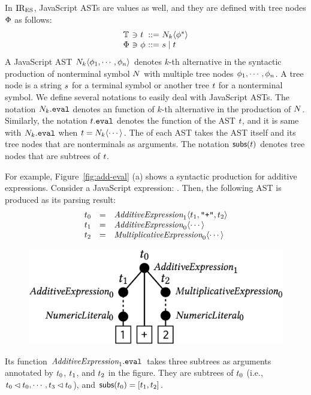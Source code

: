 In $\text{IR}_\text{ES}$, JavaScript ASTs are values as well, and they are defined with tree
nodes $\Phi$ as follows:
\[
  \begin{array}{l@{~}c@{~}l@{~}c@{~}l}
    \treeset &\ni& \tree &::=& \nt_k \langle \node^* \rangle\\
    \nodeset &\ni& \node &::=& \str \mid \tree\\
  \end{array}
\]
A JavaScript AST $N_k \langle \phi_1, \cdots, \phi_n \rangle$ denotes $k$-th
alternative in the syntactic production of nonterminal symbol $N$ with
multiple tree nodes $\phi_1, \cdots, \phi_n$.  A tree node is a string $s$
for a terminal symbol or another tree $t$ for a nonterminal symbol. We
define several notations to easily deal with JavaScript ASTs.  The notation
$\nt_k.\eval$ denotes an  function of $k$-th alternative in
the production of $N$.  Similarly, the notation $\tree.\eval$ denotes the
 function of the AST $t$, and it is same with
$\nt_k.\eval$ when $t = N_k \langle \cdots \rangle$. The
 of each AST takes the AST itself and its tree nodes that are
nonterminals as arguments.  The notation $\getsubs(\tree)$ denotes tree nodes
that are subtrees of $t$.

For example, Figure~\ref{fig:add-eval} (a) shows a syntactic production for
additive expressions.  Consider a JavaScript expression: .  Then,
the following AST is produced as its parsing result:
\[
  \begin{array}{lcl}
    \tree_0 &=&
    \essyn{AdditiveExpression}_1 \langle \tree_1, \code{"+"}, \tree_2 \rangle\\

    \tree_1 &=&
    \essyn{AdditiveExpression}_0 \langle \cdots \rangle\\

    \tree_2 &=&
    \essyn{MultiplicativeExpression}_0 \langle \cdots \rangle\\
  \end{array}
\]
\begin{figure}[H]
  \includegraphics[width=.7\columnwidth]{img/add-ast.png}
\end{figure}
\noindent Its  function $\essyn{AdditiveExpression}_1.\eval$
takes three subtrees as arguments annotated by $t_0$, $t_1$, and
$t_2$ in the figure. They are subtrees of $t_0$ (i.e., $t_0 \lhd
t_0, \cdots, t_3 \lhd t_0$), and $\getsubs(\tree_0) = [\tree_1,
\tree_2]$.

